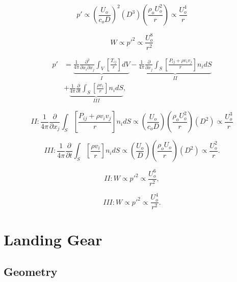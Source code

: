 \begin{equation}
p' \propto \left( \frac{U_o}{c_o D} \right)^2 \left( D^3 \right) \left( \frac{\rho_o U_o^2}{r} \right) \propto \frac{U_o^4}{r}
\end{equation}

\begin{equation}
W \propto p'^2 \propto \frac{U_o^8}{r^2}
\end{equation}

\begin{equation}
\begin{aligned}
p' &= \underbrace{ \frac{1}{4\pi} \frac{\partial^2}{\partial x_i \partial x_j} \int_V \left[ \frac{T_{ij}}{r} \right] dV }_I - \underbrace{ \frac{1}{4\pi} \frac{\partial}{\partial x_j} \int_S \left[ \frac{P_{ij} + \rho v_i v_j}{r} \right] n_i dS }_{II} \\
&+ \underbrace{ \frac{1}{4\pi} \frac{\partial}{\partial t} \int_S \left[ \frac{\rho v_i}{r} \right] n_i dS}_{III},
\end{aligned}
\end{equation}


\begin{equation}
II : \frac{1}{4\pi} \frac{\partial}{\partial x_j} \int_S \left[ \frac{P_{ij} + \rho v_i v_j}{r} \right] n_i dS \propto \left( \frac{U_o}{c_oD} \right) \left( \frac{\rho_o U_o^2}{r} \right) \left( D^2 \right) \propto \frac{U_o^3}{r}
\end{equation}

\begin{equation}
III : \frac{1}{4\pi} \frac{\partial}{\partial t} \int_S \left[ \frac{\rho v_i}{r} \right] n_i dS \propto \left( \frac{U_o}{D} \right) \left( \frac{\rho_o U_o}{r} \right) \left( D^2 \right) \propto \frac{U_o^2}{r}.
\end{equation}

\begin{equation}
II : W \propto p'^2 \propto \frac{U_o^6}{r^2},
\end{equation}

\begin{equation}
III : W \propto p'^2 \propto \frac{U_o^4}{r^2}.
\end{equation}

\section{Landing Gear}

\subsection{Geometry}


